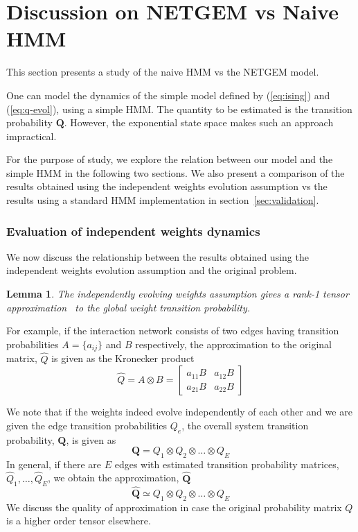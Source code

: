 \documentclass[11pt]{article}
\newtheorem{lemma}[theorem]{Lemma}
\begin{document}
\section{Discussion on NETGEM vs Naive HMM}
\label{sec:discussion}
This section presents a study of the naive HMM vs the NETGEM model. 

One can model the dynamics of the simple
model defined by (\ref{eq:ising}) and (\ref{eq:q-evol}), using a
simple HMM. The quantity to be estimated is the transition probability
$\mathbf Q$. However, the exponential state space makes such an
approach impractical. 

For the purpose of study, we explore the relation between our model
and the simple HMM in the following two sections. We also present a comparison of
the results obtained using the independent weights evolution
assumption vs the results using a standard HMM implementation in  section~\ref{sec:validation}.

\subsubsection{Evaluation of independent weights dynamics} 
\label{sec:validity-assumption}
We now discuss the
relationship between the results obtained using the independent
weights evolution assumption and the original problem.  
\begin{lemma}
The independently evolving weights assumption gives a rank-1 tensor approximation~\cite{Horn90}  to the global weight
transition probability.  
\end{lemma}
For example, if the interaction network consists of two edges having transition
probabilities $A = \{a_{ij}\}$
and $B$ respectively, the approximation to
the original matrix, $\hat{Q}$ is given as the Kronecker product
\[ \hat{Q} = A \otimes B = \left[
  \begin{array}{cc}
    a_{11} B & a_{12} B \\
    a_{21} B & a_{22} B
  \end{array}
\right]
\]

We note that if the weights indeed evolve independently of each other
and we are given the edge transition probabilities
$Q_{e}$, the overall system transition probability, $\mathbf{Q}$, is
given as 
\[
\mathbf{Q} = Q_{1} \otimes Q_{2} \otimes \ldots \otimes Q_{E}
\]
In general, if there are $E$ edges with estimated transition
probability matrices, $\hat{Q}_{1}, \ldots, \hat{Q}_{E}$, we obtain the approximation, $\hat{\mathbf{Q}}$
\[
\hat{\mathbf{Q}} \simeq Q_{1} \otimes Q_{2} \otimes \ldots \otimes Q_{E}
\]
We discuss the quality of approximation in case the original
probability matrix $Q$ is a higher order tensor
elsewhere. 
\end{document}

